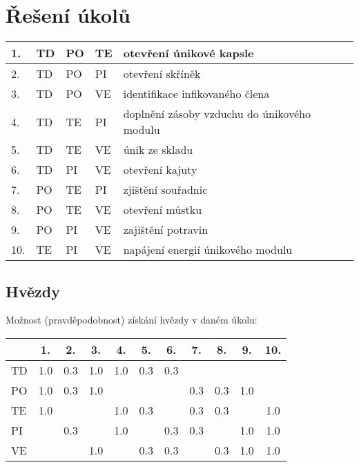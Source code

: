 \documentclass[11pt,oneside,a4paper]{article}
\begin{document}
\section{\texorpdfstring{Řešení úkolů}{Reseni ukolu}}
\label{sec:reseni_ukolu}
\begin{center}
	\begin{tabular}{l | l | l | l | l}
	\hline \hline
		1. & TD & PO & TE & otevření únikové kapsle \\ \hline
		2. & TD & PO & PI & otevření skříněk \\ \hline
		3. & TD & PO & VE & identifikace infikovaného člena \\ \hline
		4. & TD & TE & PI & doplnění zásoby vzduchu do únikového modulu \\ \hline
		5. & TD & TE & VE & únik ze skladu \\ \hline
		6. & TD & PI & VE & otevření kajuty \\ \hline
		7. & PO & TE & PI & zjištění souřadnic \\ \hline
		8. & PO & TE & VE & otevření můstku \\ \hline
		9. & PO & PI & VE & zajištění potravin \\ \hline
		10. & TE & PI & VE & napájení energií únikového modulu \\ \hline \hline
	\end{tabular}
\end{center}

\subsection{\texorpdfstring{Hvězdy}{Hvezdy}}
\label{subsec:vyvazeni_hry}
Možnost (pravděpodobnost) získání hvězdy v daném úkolu:
\begin{center} 
	\begin{tabular}{l | c | c | c | c | c | c | c | c | c | c }
	\hline \hline 
		   & 1. & 2. & 3. & 4. & 5. & 6. & 7. & 8. & 9. & 10. \\ \hline
		TD & 1.0& 0.3& 1.0& 1.0& 0.3& 0.3&    &    &    &     \\ \hline
		PO & 1.0& 0.3& 1.0&    &    &    & 0.3& 0.3& 1.0&     \\ \hline
		TE & 1.0&    &    & 1.0& 0.3&    & 0.3& 0.3&    & 1.0 \\ \hline
		PI &    & 0.3&    & 1.0&    & 0.3& 0.3&    & 1.0& 1.0 \\ \hline
		VE &    &    & 1.0&    & 0.3& 0.3&    & 0.3& 1.0& 1.0 \\ \hline \hline
	\end{tabular}
\end{center}
\end{document}
